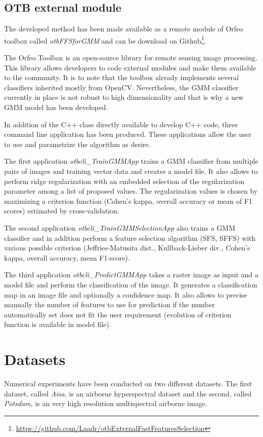 \documentclass[journal,peerreview,onecolumn]{IEEEtran}
\begin{document}
    \subsection{OTB external module}
    \label{sec:otb-module}

    The developed method has been made available as a remote module of Orfeo toolbox called \emph{otbFFSforGMM} and can be download on Github\footnote{\url{https://github.com/Laadr/otbExternalFastFeaturesSelection}}.

    The Orfeo Toolbox is an open-source library for remote sensing image processing. This library allows developers to code external modules and make them available to the community. It is to note that the toolbox already implements several classifiers inherited mostly from OpenCV. Nevertheless, the GMM classifier currently in place is not robust to high dimensionality and that is why a new GMM model has been developed.

    In addition of the C++ class directly available to develop C++ code, three command line application has been produced. These applications allow the user to use and parametrize the algorithm as desire.

    The first application \emph{otbcli\_TrainGMMApp} trains a GMM classifier from multiple pairs of images and training vector data and creates a model file. It also allows to perform ridge regularization with an embedded selection of the regularization parameter among a list of proposed values. The regularization values is chosen by maximizing a criterion function (Cohen's kappa, overall accuracy or mean of F1 scores) estimated by cross-validation.

    The second application \emph{otbcli\_TrainGMMSelectionApp} also trains a GMM classifier and in addition perform a feature selection algorithm (SFS, SFFS) with various possible criterion (Jeffries-Matusita dist., Kullback-Lieber div., Cohen’s kappa, overall accuracy, mean F1-score).

    The third application \emph{otbcli\_PredictGMMApp} takes a raster image as input and a model file and perform the classification of the image. It generates a classification map in an image file and optionally a confidence map. It also allows to precise manually the number of features to use for prediction if the number automatically set does not fit the user requirement (evolution of criterion function is available in model file).

\section{Datasets}
\label{sec:datasets}
Numerical experiments  have been conducted on  two different datasets.
The first  dataset, called  \emph{Aisa}, is an  airborne hyperspectral
dataset  and  the  second,  called \emph{Potsdam},  is  an  very  high
resolution multispectral airborne image.
\end{document}

